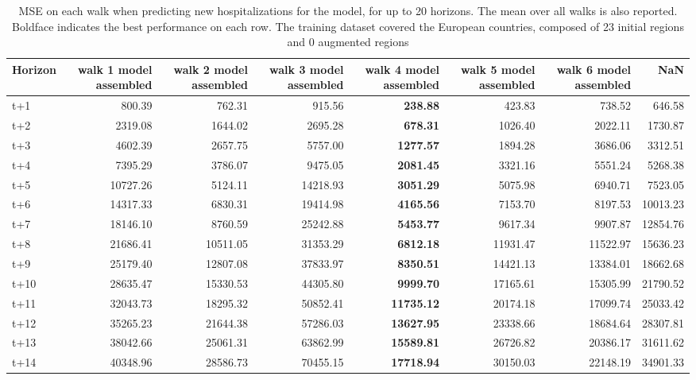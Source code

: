 \begin{table}[H]
\centering
\caption{MSE on each walk when predicting new hospitalizations for the model, for up to 20 horizons. The mean over all walks is also reported. Boldface indicates the best performance on each row. The training dataset covered the European countries, composed of 23 initial regions and 0 augmented regions }
\label{tab:MSE_walk_assembly}
\begin{tabular}{lrrrrrrr}
\toprule
Horizon &  walk 1 model assembled &  walk 2 model assembled &  walk 3 model assembled &  walk 4 model assembled &  walk 5 model assembled &  walk 6 model assembled &      NaN \\
\midrule
t+1  & 800.39  & 762.31  & 915.56  & \textbf{238.88}  & 423.83  & 738.52  & 646.58  \\
t+2  & 2319.08  & 1644.02  & 2695.28  & \textbf{678.31}  & 1026.40  & 2022.11  & 1730.87  \\
t+3  & 4602.39  & 2657.75  & 5757.00  & \textbf{1277.57}  & 1894.28  & 3686.06  & 3312.51  \\
t+4  & 7395.29  & 3786.07  & 9475.05  & \textbf{2081.45}  & 3321.16  & 5551.24  & 5268.38  \\
t+5  & 10727.26  & 5124.11  & 14218.93  & \textbf{3051.29}  & 5075.98  & 6940.71  & 7523.05  \\
t+6  & 14317.33  & 6830.31  & 19414.98  & \textbf{4165.56}  & 7153.70  & 8197.53  & 10013.23  \\
t+7  & 18146.10  & 8760.59  & 25242.88  & \textbf{5453.77}  & 9617.34  & 9907.87  & 12854.76  \\
t+8  & 21686.41  & 10511.05  & 31353.29  & \textbf{6812.18}  & 11931.47  & 11522.97  & 15636.23  \\
t+9  & 25179.40  & 12807.08  & 37833.97  & \textbf{8350.51}  & 14421.13  & 13384.01  & 18662.68  \\
t+10  & 28635.47  & 15330.53  & 44305.80  & \textbf{9999.70}  & 17165.61  & 15305.99  & 21790.52  \\
t+11  & 32043.73  & 18295.32  & 50852.41  & \textbf{11735.12}  & 20174.18  & 17099.74  & 25033.42  \\
t+12  & 35265.23  & 21644.38  & 57286.03  & \textbf{13627.95}  & 23338.66  & 18684.64  & 28307.81  \\
t+13  & 38042.66  & 25061.31  & 63862.99  & \textbf{15589.81}  & 26726.82  & 20386.17  & 31611.62  \\
t+14  & 40348.96  & 28586.73  & 70455.15  & \textbf{17718.94}  & 30150.03  & 22148.19  & 34901.33  \\

\end{tabular}
\end{table}
